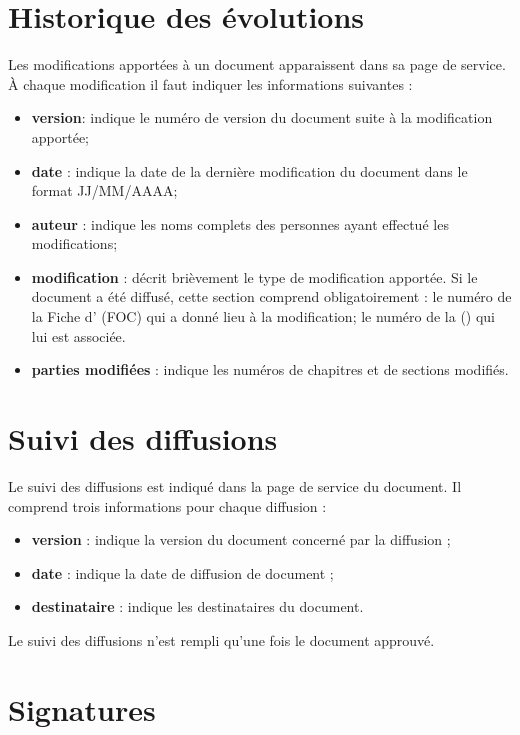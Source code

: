 \section{Historique des évolutions}

Les modifications apportées à un document apparaissent dans sa page de service. À chaque modification il faut indiquer les informations suivantes :
\begin{itemize}
 \item \textbf{version}: indique le numéro de version du document suite à la modification apportée;
\item \textbf{date} : indique la date de la dernière modification du document dans le format JJ/MM/AAAA;
\item \textbf{auteur} : indique les noms complets des personnes ayant effectué les modifications;
\item \textbf{modification} : décrit brièvement le type de modification apportée. Si le document a
été diffusé, cette section comprend obligatoirement :
	\subitem \textbullet{ }le numéro de la Fiche d'\OC{} (FOC) qui a donné lieu à la modification;
	\subitem \textbullet{ }le numéro de la \FFT{} (\FFTCourt{}) qui lui est associée.
\item \textbf{parties modifiées} : indique les numéros de chapitres et de sections modifiés.
\end{itemize}

\section{Suivi des diffusions}

Le suivi des diffusions est indiqué dans la page de service du document. Il comprend trois informations pour chaque diffusion :
\begin{itemize}
\item \textbf{version} : indique la version du document concerné par la diffusion ;
\item  \textbf{date} : indique la date de diffusion de document ;
\item \textbf{destinataire} : indique les destinataires du document. 
\end{itemize}
 Le suivi des diffusions n’est rempli qu’une fois le document approuvé.

\section{Signatures}

